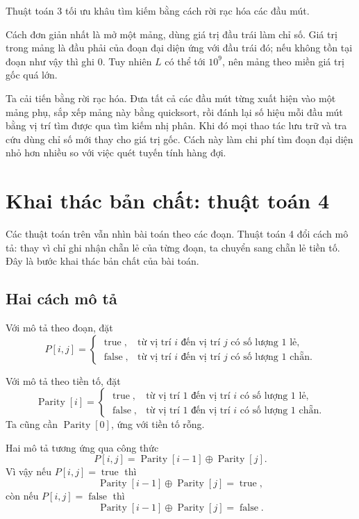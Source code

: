 \documentclass[11pt]{article}
\begin{document}
Thuật toán 3 tối ưu khâu tìm kiếm bằng cách rời rạc hóa các đầu mút.

Cách đơn giản nhất là mở một mảng, dùng giá trị đầu trái làm chỉ số. Giá trị
trong mảng là đầu phải của đoạn đại diện ứng với đầu trái đó; nếu không tồn
tại đoạn như vậy thì ghi \(0\). Tuy nhiên \(L\) có thể tới \(10^9\), nên mảng
theo miền giá trị gốc quá lớn.

Ta cải tiến bằng rời rạc hóa. Đưa tất cả các đầu mút từng xuất hiện vào một
mảng phụ, sắp xếp mảng này bằng quicksort, rồi đánh lại số hiệu mỗi đầu mút
bằng vị trí tìm được qua tìm kiếm nhị phân. Khi đó mọi thao tác lưu trữ và
tra cứu dùng chỉ số mới thay cho giá trị gốc. Cách này làm chi phí tìm đoạn
đại diện nhỏ hơn nhiều so với việc quét tuyến tính hàng đợi.

\section{Khai thác bản chất: thuật toán 4}

Các thuật toán trên vẫn nhìn bài toán theo các đoạn. Thuật toán 4 đổi cách mô
tả: thay vì chỉ ghi nhận chẵn lẻ của từng đoạn, ta chuyển sang chẵn lẻ tiền
tố. Đây là bước khai thác bản chất của bài toán.

\subsection{Hai cách mô tả}

Với mô tả theo đoạn, đặt
\[
P[i,j]=
\begin{cases}
\operatorname{true}, & \text{từ vị trí } i \text{ đến vị trí } j
  \text{ có số lượng }1\text{ lẻ},\\
\operatorname{false}, & \text{từ vị trí } i \text{ đến vị trí } j
  \text{ có số lượng }1\text{ chẵn}.
\end{cases}
\]

Với mô tả theo tiền tố, đặt
\[
\operatorname{Parity}[i]=
\begin{cases}
\operatorname{true}, & \text{từ vị trí }1\text{ đến vị trí }i
  \text{ có số lượng }1\text{ lẻ},\\
\operatorname{false}, & \text{từ vị trí }1\text{ đến vị trí }i
  \text{ có số lượng }1\text{ chẵn}.
\end{cases}
\]
Ta cũng cần \(\operatorname{Parity}[0]\), ứng với tiền tố rỗng.

Hai mô tả tương ứng qua công thức
\[
  P[i,j]=\operatorname{Parity}[i-1]\oplus \operatorname{Parity}[j].
\]
Vì vậy nếu \(P[i,j]=\operatorname{true}\) thì
\[
  \operatorname{Parity}[i-1]\oplus \operatorname{Parity}[j]
  =\operatorname{true},
\]
còn nếu \(P[i,j]=\operatorname{false}\) thì
\[
  \operatorname{Parity}[i-1]\oplus \operatorname{Parity}[j]
  =\operatorname{false}.
\]
\end{document}
